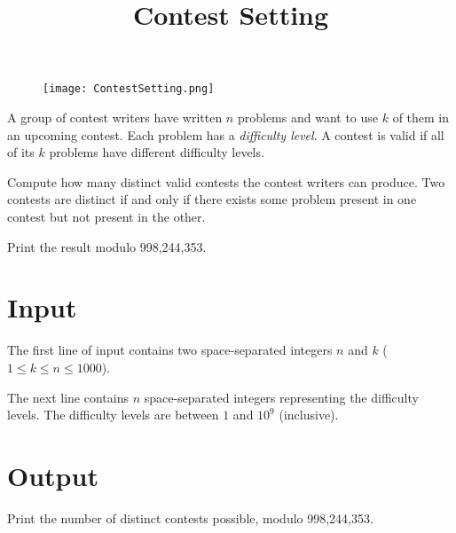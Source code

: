 \documentclass{article}
\title{Contest Setting}
\date{}
\begin{document}
\maketitle
\begin{figure}[h!]
\centering
\texttt{[image: ContestSetting.png]}
\end{figure}


A group of contest writers have written $n$ problems and want to use
$k$ of them in an upcoming contest. Each problem has a \emph{difficulty
level}. A contest is valid if all of its $k$ problems have different
difficulty levels.

Compute how many distinct valid contests the contest writers can produce.
Two contests are distinct if and only if there exists some problem present in
one contest but not present in the other.

Print the result modulo 998,244,353.

\section{Input}

The first line of input contains two space-separated integers $n$ and $k$
($1 \le k \le n \le 1000$).

The next line contains $n$ space-separated integers representing
the difficulty levels. The difficulty levels are between $1$ and $10^9$ (inclusive).

\section{Output}

Print the number of distinct contests possible, modulo 998,244,353.

\end{document}
